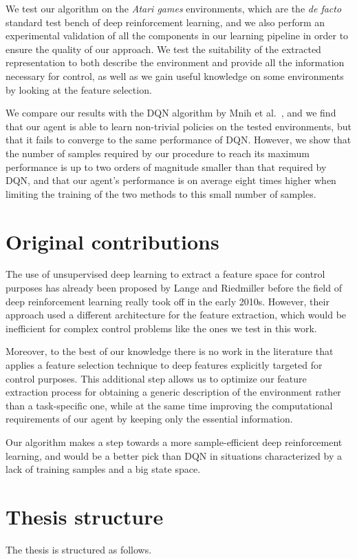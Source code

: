 We test our algorithm on the \textit{Atari games} environments, which are
the \textit{de facto} standard test bench of deep reinforcement learning, and we 
also perform an experimental validation of all the components in our learning 
pipeline in order to ensure the quality of our approach.
We test the suitability of the extracted representation to both describe the 
environment and provide all the information necessary for control, as well as 
we gain useful knowledge on some environments by looking at the feature 
selection.

We compare our results with the DQN algorithm by Mnih et al.\ \cite{mnih2015human},
and we find that our agent is able to learn non-trivial policies on the tested 
environments, but that it fails to converge to the same performance of DQN. 
However, we show that the number of samples required by our procedure to reach 
its maximum performance is up to two orders of magnitude smaller than that 
required by DQN, and that our agent's performance is on average eight times 
higher when limiting the training of the two methods to this small number of 
samples.

\section{Original contributions}
The use of unsupervised deep learning to extract a feature space for control 
purposes has already been proposed by Lange and Riedmiller \cite{lange2010deep} 
before the field of deep reinforcement learning really took off in the early 
2010s. 
However, their approach used a different architecture for the feature extraction, 
which would be inefficient for complex control problems like the ones we test
in this work. 

Moreover, to the best of our knowledge there is no work in the literature that
applies a feature selection technique to deep features explicitly targeted 
for control purposes. 
This additional step allows us to optimize our feature extraction process for 
obtaining a generic description of the environment rather than a task-specific 
one, while at the same time improving the computational requirements of our 
agent by keeping only the essential information. 

Our algorithm makes a step towards a more sample-efficient deep reinforcement 
learning, and would be a better pick than DQN in situations characterized by a 
lack of training samples and a big state space. 

\section{Thesis structure}
The thesis is structured as follows. 


